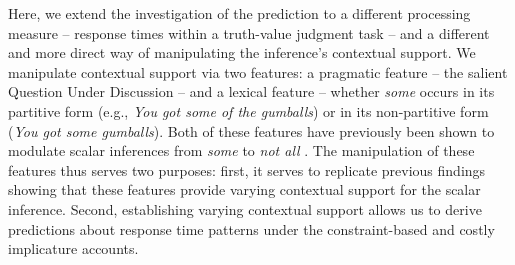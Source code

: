 \documentclass[10pt,letterpaper]{article}
\begin{document}
Here, we extend the investigation of the prediction to a different processing measure -- response times within a truth-value judgment task -- and a different and more direct way of manipulating the inference's contextual support. We manipulate contextual support via two features: a pragmatic feature -- the salient Question Under Discussion \cite<QUD, >{Roberts2012} -- and a lexical feature -- whether  \emph{some} occurs in its partitive form (e.g., \emph{You got some of the gumballs}) or in its non-partitive form (\emph{You got some gumballs}). Both of these features have previously been shown to modulate scalar inferences from \emph{some} to \emph{not all} \cite{Zondervan2010, DegenGoodman2014, Degen2015, DegenTanenhaus2015}. The manipulation of these features thus serves two purposes: first, it serves to replicate previous findings showing that these features provide varying contextual support for the scalar inference. Second, establishing varying contextual support allows us to derive predictions about response time patterns under the constraint-based and costly implicature accounts.




\end{document}

